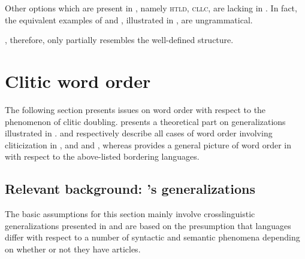 \documentclass[output=paper,
colorlinks,
citecolor=brown,
newtxmath
]{langscibook}
\begin{document}
\noindent Other options which are present in , namely \textsc{htld}, \textsc{cllc}, are lacking in . In fact, the equivalent  examples of  and , illustrated in \citet{Cinque.Krapova2008}, are ungrammatical.


\z

\noindent {}, therefore, only partially resembles the well-defined  structure.
%
%
\section{Clitic word order}
\label{sec:cliticorder}
The following section presents issues on word order with respect to the phenomenon of clitic doubling.  presents a theoretical part on generalizations illustrated in \citet{Boskovic2001,Boskovic2004a,Boskovic2004b,Boskovic2007,Boskovic2016}.  and  respectively describe all cases of word order involving cliticization in , and  and , whereas  provides a general picture of word order in  with respect to the above-listed bordering languages.

\subsection{Relevant background: \citeauthor{Boskovic2001}'s generalizations}
\label{subsec:assumptions}
The basic assumptions for this section mainly involve crosslinguistic generalizations presented in \citet{Boskovic2001,Boskovic2004a,Boskovic2004b,Boskovic2007,Boskovic2016} and are based on the presumption that languages differ with respect to a number of syntactic and semantic phenomena depending on whether or not they have articles.
\end{document}
